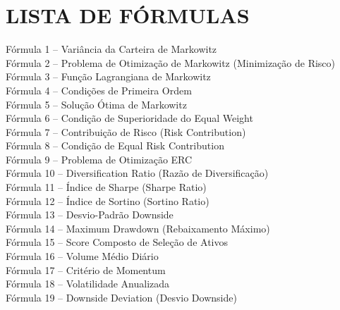 
\chapter*{LISTA DE FÓRMULAS}

\vspace{1cm}

\noindent
Fórmula 1 -- Variância da Carteira de Markowitz \\
Fórmula 2 -- Problema de Otimização de Markowitz (Minimização de Risco) \\
Fórmula 3 -- Função Lagrangiana de Markowitz \\
Fórmula 4 -- Condições de Primeira Ordem \\
Fórmula 5 -- Solução Ótima de Markowitz \\
Fórmula 6 -- Condição de Superioridade do Equal Weight \\
Fórmula 7 -- Contribuição de Risco (Risk Contribution) \\
Fórmula 8 -- Condição de Equal Risk Contribution \\
Fórmula 9 -- Problema de Otimização ERC \\
Fórmula 10 -- Diversification Ratio (Razão de Diversificação) \\
Fórmula 11 -- Índice de Sharpe (Sharpe Ratio) \\
Fórmula 12 -- Índice de Sortino (Sortino Ratio) \\
Fórmula 13 -- Desvio-Padrão Downside \\
Fórmula 14 -- Maximum Drawdown (Rebaixamento Máximo) \\
Fórmula 15 -- Score Composto de Seleção de Ativos \\
Fórmula 16 -- Volume Médio Diário \\
Fórmula 17 -- Critério de Momentum \\
Fórmula 18 -- Volatilidade Anualizada \\
Fórmula 19 -- Downside Deviation (Desvio Downside) 